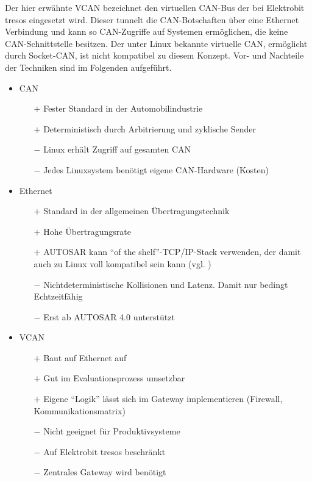 \documentclass[
  a4paper,					    %
  twoside,
  DIV=calc,     				%
  bibliography=totoc,
  cleardoublepage=empty,
  ngerman,     					%
  final       					%
]{scrbook}
\begin{document}
Der hier erwähnte VCAN bezeichnet den virtuellen CAN-Bus der bei Elektrobit tresos eingesetzt wird. Dieser tunnelt die CAN-Botschaften über eine Ethernet Verbindung und kann so CAN-Zugriffe auf Systemen ermöglichen, die keine CAN-Schnittstelle besitzen. Der unter Linux bekannte virtuelle CAN, ermöglicht durch Socket-CAN, ist nicht kompatibel zu diesem Konzept. Vor- und Nachteile der Techniken sind im Folgenden aufgeführt.

\begin{itemize}
    \item CAN
    \begin{itemize}
        \item[$+$] Fester Standard in der Automobilindustrie
        \item[$+$] Deterministisch durch Arbitrierung und zyklische Sender
        \item[$-$] Linux erhält Zugriff auf gesamten CAN
        \item[$-$] Jedes Linuxsystem benötigt eigene CAN-Hardware (Kosten)
    \end{itemize}
    \item Ethernet
    \begin{itemize}
        \item[$+$] Standard in der allgemeinen Übertragungstechnik
        \item[$+$] Hohe Übertragungsrate
        \item[$+$] AUTOSAR kann "`of the shelf"'-TCP/IP-Stack verwenden, der damit auch zu Linux voll kompatibel sein kann (vgl. \cite[S. 21]{autosar_eth})
        \item[$-$] Nichtdeterministische Kollisionen und Latenz. Damit nur bedingt Echtzeitfähig
        \item[$-$] Erst ab AUTOSAR 4.0 unterstützt
    \end{itemize}
    \item VCAN
    \begin{itemize}
        \item[$+$] Baut auf Ethernet auf
        \item[$+$] Gut im Evaluationsprozess umsetzbar
        \item[$+$] Eigene "`Logik"' lässt sich im Gateway implementieren (Firewall, Kommunikationsmatrix)
        \item[$-$] Nicht geeignet für Produktivsysteme
        \item[$-$] Auf Elektrobit tresos beschränkt
        \item[$-$] Zentrales Gateway wird benötigt
    \end{itemize}
\end{itemize}
\end{document}
